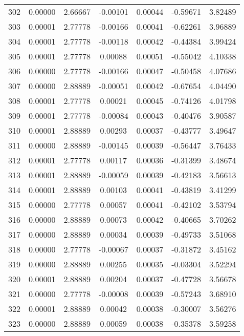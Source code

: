 \begin{longtable}{c c c c c c c}
302 &  0.00000 &      2.66667 & -0.00101 &   0.00044 &  -0.59671 &   3.82489 \\
303 &  0.00001 &      2.77778 & -0.00166 &   0.00041 &  -0.62261 &   3.96889 \\
304 &  0.00001 &      2.77778 & -0.00118 &   0.00042 &  -0.44384 &   3.99424 \\
305 &  0.00001 &      2.77778 &  0.00088 &   0.00051 &  -0.55042 &   4.10338 \\
306 &  0.00000 &      2.77778 & -0.00166 &   0.00047 &  -0.50458 &   4.07686 \\
307 &  0.00000 &      2.88889 & -0.00051 &   0.00042 &  -0.67654 &   4.04490 \\
308 &  0.00001 &      2.77778 &  0.00021 &   0.00045 &  -0.74126 &   4.01798 \\
309 &  0.00001 &      2.77778 & -0.00084 &   0.00043 &  -0.40476 &   3.90587 \\
310 &  0.00001 &      2.88889 &  0.00293 &   0.00037 &  -0.43777 &   3.49647 \\
311 &  0.00000 &      2.88889 & -0.00145 &   0.00039 &  -0.56447 &   3.76433 \\
312 &  0.00001 &      2.77778 &  0.00117 &   0.00036 &  -0.31399 &   3.48674 \\
313 &  0.00001 &      2.88889 & -0.00059 &   0.00039 &  -0.42183 &   3.56613 \\
314 &  0.00001 &      2.88889 &  0.00103 &   0.00041 &  -0.43819 &   3.41299 \\
315 &  0.00000 &      2.77778 &  0.00057 &   0.00041 &  -0.42102 &   3.53794 \\
316 &  0.00000 &      2.88889 &  0.00073 &   0.00042 &  -0.40665 &   3.70262 \\
317 &  0.00000 &      2.88889 &  0.00034 &   0.00039 &  -0.49733 &   3.51068 \\
318 &  0.00000 &      2.77778 & -0.00067 &   0.00037 &  -0.31872 &   3.45162 \\
319 &  0.00000 &      2.88889 &  0.00255 &   0.00035 &  -0.03304 &   3.52294 \\
320 &  0.00001 &      2.88889 &  0.00204 &   0.00037 &  -0.47728 &   3.56678 \\
321 &  0.00000 &      2.77778 & -0.00008 &   0.00039 &  -0.57243 &   3.68910 \\
322 &  0.00001 &      2.88889 &  0.00042 &   0.00038 &  -0.30007 &   3.56276 \\
323 &  0.00000 &      2.88889 &  0.00059 &   0.00038 &  -0.35378 &   3.59258 \\

\end{longtable}
